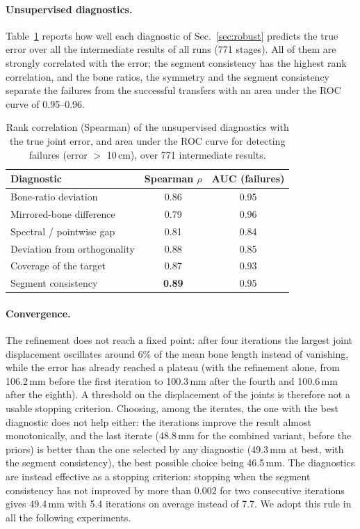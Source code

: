 \documentclass[11pt]{article}
\begin{document}
\paragraph{Unsupervised diagnostics.} Table~\ref{tab:diagnostics} reports how
well each diagnostic of Sec.~\ref{sec:robust} predicts the true error over all
the intermediate results of all runs (771 stages). All of them are strongly
correlated with the error; the segment consistency has the highest rank
correlation, and the bone ratios, the symmetry and the segment consistency
separate the failures from the successful transfers with an area under the
ROC curve of 0.95--0.96.

\begin{table}[t]
  \centering
  \caption{Rank correlation (Spearman) of the unsupervised diagnostics with the
  true joint error, and area under the ROC curve for detecting failures
  (error $>$ 10\,cm), over 771 intermediate results.}
  \label{tab:diagnostics}
  \small
  \begin{tabular}{lcc}
    \toprule
    Diagnostic & Spearman $\rho$ & AUC (failures) \\
    \midrule
    Bone-ratio deviation             & 0.86 & 0.95 \\
    Mirrored-bone difference          & 0.79 & 0.96 \\
    Spectral / pointwise gap          & 0.81 & 0.84 \\
    Deviation from orthogonality      & 0.88 & 0.85 \\
    Coverage of the target            & 0.87 & 0.93 \\
    Segment consistency               & \textbf{0.89} & 0.95 \\
    \bottomrule
  \end{tabular}
\end{table}

\paragraph{Convergence.} The refinement does not reach a fixed point: after
four iterations the largest joint displacement oscillates around 6\% of the
mean bone length instead of vanishing, while the error has already reached a
plateau (with the refinement alone, from 106.2\,mm before the first iteration
to 100.3\,mm after the fourth and 100.6\,mm after the eighth). A threshold on
the displacement of the joints is therefore not a usable stopping criterion.
Choosing, among the iterates, the one with the best diagnostic does not help
either: the iterations improve the result almost monotonically, and the last
iterate (48.8\,mm for the combined variant, before the priors) is better than
the one selected by any diagnostic (49.3\,mm at best, with the segment
consistency), the best possible choice being 46.5\,mm. The diagnostics are
instead effective as a stopping criterion: stopping when the segment
consistency has not improved by more than $0.002$ for two consecutive
iterations gives 49.4\,mm with 5.4 iterations on average instead of 7.7. We
adopt this rule in all the following experiments.
\end{document}
